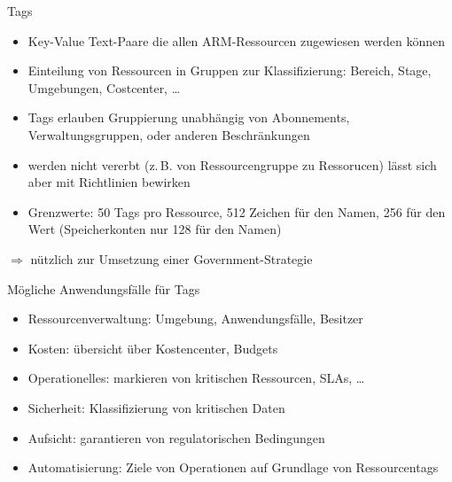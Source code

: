 

\begin{flashcard}[Definition]{Tags}
  \begin{itemize}
    \item Key-Value Text-Paare die allen ARM-Ressourcen zugewiesen werden können
    \item Einteilung von Ressourcen in Gruppen zur Klassifizierung:\newline
      Bereich, Stage, Umgebungen, Costcenter, \ldots
    \item Tags erlauben Gruppierung unabhängig von Abonnements, Verwaltungsgruppen, oder anderen Beschränkungen
    \item werden nicht vererbt (z.\,B. von Ressourcengruppe zu Ressorucen)\newline
      lässt sich aber mit Richtlinien bewirken
    \item Grenzwerte: 50 Tags pro Ressource, 512 Zeichen für den Namen, 256 für den Wert\newline
      (Speicherkonten nur 128 für den Namen)
  \end{itemize}
  $\Rightarrow$ nützlich zur Umsetzung einer Government-Strategie
\end{flashcard}

\begin{flashcard}[Definition]{Mögliche Anwendungsfälle für Tags}
  \begin{itemize}
    \item Ressourcenverwaltung: Umgebung, Anwendungsfälle, Besitzer
    \item Kosten: übersicht über Kostencenter, Budgets
    \item Operationelles: markieren von kritischen Ressourcen, SLAs, \ldots
    \item Sicherheit: Klassifizierung von kritischen Daten
    \item Aufsicht: garantieren von regulatorischen Bedingungen
    \item Automatisierung: Ziele von Operationen auf Grundlage von Ressourcentags
  \end{itemize}
\end{flashcard}

